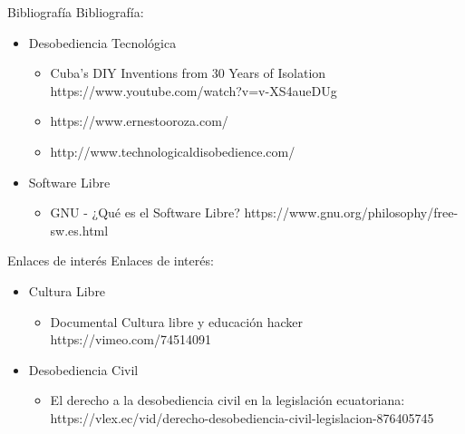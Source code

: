\documentclass[spanish]{beamer}
\begin{document}
\begin{frame}{Bibliografía}
    Bibliografía:    
    \begin{itemize}
        \item Desobediencia Tecnológica
        \begin{itemize}            
            \item Cuba's DIY Inventions from 30 Years of Isolation https://www.youtube.com/watch?v=v-XS4aueDUg
            \item https://www.ernestooroza.com/
            \item http://www.technologicaldisobedience.com/
        \end{itemize}
        \item Software Libre  
        \begin{itemize}            
            \item GNU - ¿Qué es el Software Libre? https://www.gnu.org/philosophy/free-sw.es.html
        \end{itemize}      
    \end{itemize}     
\end{frame}

\begin{frame}{Enlaces de interés}
    Enlaces de interés:    
    \begin{itemize}
        \item Cultura Libre  
        \begin{itemize}            
            \item Documental Cultura libre y educación hacker https://vimeo.com/74514091
        \end{itemize}      
        \item Desobediencia Civil
        \begin{itemize}
            \item El derecho a la desobediencia civil en la legislación ecuatoriana:
            https://vlex.ec/vid/derecho-desobediencia-civil-legislacion-876405745
        \end{itemize}
    \end{itemize}    
\end{frame}
\end{document}
